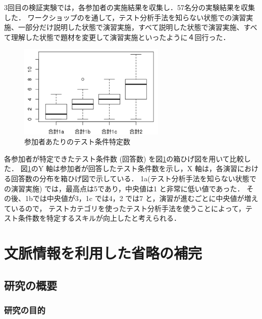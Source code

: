 \documentclass[10pt,a4j]{jarticle}
\begin{document}
3回目の検証実験では，各参加者の実施結果を収集し．57名分の実験結果を収集した．
ワークショップのを通して，テスト分析手法を知らない状態での演習実施、一部分だけ説明した状態で演習実施，すべて説明した状態で演習実施、すべて理解した状態で題材を変更して演習実施といったように４回行った．
\begin{figure}[h]
  \begin{center}
  \includegraphics[width=7cm]{./image/D-3-Fig10.png}
  \caption{参加者あたりのテスト条件特定数}
  \label{fig:D-3-Fig10}
  \end{center}
\end{figure}

各参加者が特定できたテスト条件数 (回答数) を図\ref{fig:D-3-Fig10}の箱ひげ図を用いて比較した．
図\ref{fig:D-3-Fig10}のY 軸は参加者が回答したテスト条件数を示し，X 軸は，各演習における回答数の分布を箱ひげ図で示している． 1a(テスト分析手法を知らない状態での演習実施) では，最高点は5であり，中央値は1 と非常に低い値であった．
その後、1bでは中央値が3，1c では4，2 では7 と，演習が進むごとに中央値が増えているので， テストカテゴリを使ったテスト分析手法を使うことによって，テスト条件数を特定するスキルが向上したと考えられる．

\section{文脈情報を利用した省略の補完} \label{chap:4}
\subsection{研究の概要} \label{sec:4-1}
\subsubsection{研究の目的} \label{sec:4-1-1}

\end{document}
